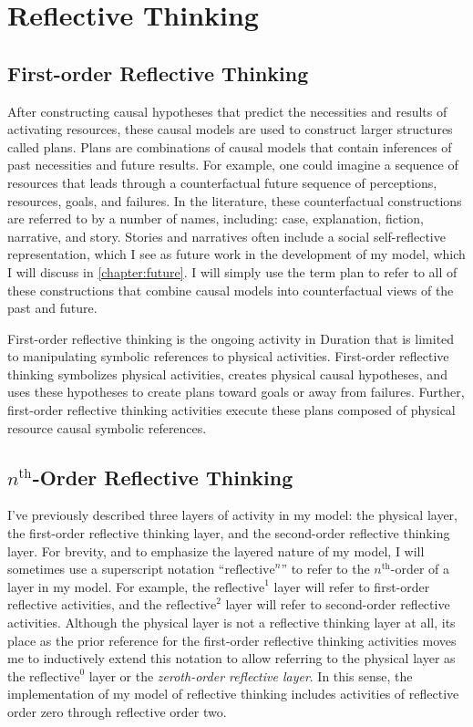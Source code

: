 \chapter{Reflective Thinking}
\label{chapter:reflective_thinking}

\section{First-order Reflective Thinking}

After constructing causal hypotheses that predict the necessities and
results of activating resources, these causal models are used to
construct larger structures called plans.  Plans are combinations of
causal models that contain inferences of past necessities and future
results.  For example, one could imagine a sequence of resources that
leads through a counterfactual future sequence of perceptions,
resources, goals, and failures.  In the literature, these
counterfactual constructions are referred to by a number of names,
including: case, explanation, fiction, narrative, and story.  Stories
and narratives often include a social self-reflective representation,
which I see as future work in the development of my model, which I
will discuss in \autoref{chapter:future}.  I will simply use the term
plan to refer to all of these constructions that combine causal models
into counterfactual views of the past and future.

First-order reflective thinking is the ongoing activity in Duration
that is limited to manipulating symbolic references to physical
activities.  First-order reflective thinking symbolizes physical
activities, creates physical causal hypotheses, and uses these
hypotheses to create plans toward goals or away from failures.
Further, first-order reflective thinking activities execute these
plans composed of physical resource causal symbolic references.

\section{$n^\text{th}$-Order Reflective Thinking}

I've previously described three layers of activity in my model: the
physical layer, the first-order reflective thinking layer, and the
second-order reflective thinking layer.  For brevity, and to emphasize
the layered nature of my model, I will sometimes use a superscript
notation ``$\text{reflective}^n$'' to refer to the $n^\text{th}$-order
of a layer in my model.  For example, the $\text{reflective}^1$ layer
will refer to first-order reflective activities, and the
$\text{reflective}^2$ layer will refer to second-order reflective
activities.  Although the physical layer is not a reflective thinking
layer at all, its place as the prior reference for the first-order
reflective thinking activities moves me to inductively extend this
notation to allow referring to the physical layer as the
$\text{reflective}^0$ layer or the \emph{zeroth-order reflective
  layer}.  In this sense, the implementation of my model of reflective
thinking includes activities of reflective order zero through
reflective order two.

